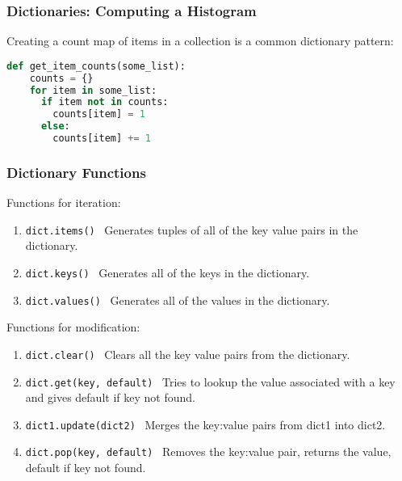 \documentclass{beamer}
\begin{document}
%
%
\begin{frame}[fragile]
  \frametitle{Dictionaries: Computing a Histogram}
  Creating a count map of items in a collection is a common dictionary pattern:
  \begin{lstlisting}[language=Python, autogobble]
  def get_item_counts(some_list):
    counts = {}
    for item in some_list:
      if item not in counts:
        counts[item] = 1
      else:
        counts[item] += 1
  \end{lstlisting}
\end{frame}

%
%
\begin{frame}[fragile]
  \frametitle{Dictionary Functions}
  Functions for iteration:
  \begin{enumerate}
    \item \lstinline|dict.items()| \textrightarrow \ Generates tuples of all of the key value pairs in the dictionary.
    \item \lstinline|dict.keys()| \textrightarrow \ Generates all of the keys in the dictionary.
    \item \lstinline|dict.values()| \textrightarrow \ Generates all of the values in the dictionary.
  \end{enumerate}
  \vfill
  Functions for modification:
  \begin{enumerate}
    \item \lstinline|dict.clear()| \textrightarrow \ Clears all the key value pairs from the dictionary.
    \item \lstinline|dict.get(key, default)| \textrightarrow \ Tries to lookup the value associated with a key and gives default if key not found.
    \item \lstinline|dict1.update(dict2)| \textrightarrow \ Merges the key:value pairs from dict1 into dict2. 
    \item \lstinline|dict.pop(key, default)| \textrightarrow \ Removes the key:value pair, returns the value, default if key not found.
  \end{enumerate}
\end{frame}
\end{document}
